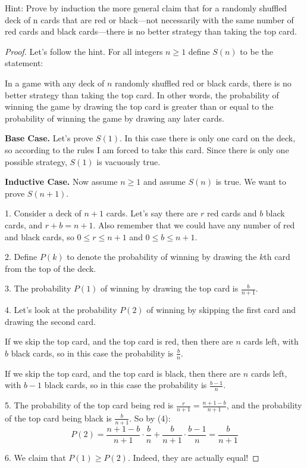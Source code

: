 \documentclass[14pt]{extarticle}
\begin{document}
Hint: Prove by induction the more general claim that for a randomly shuffled deck of n cards that are red or black—not necessarily with the same number of red cards and black cards—there is no better strategy
than taking the top card.
\begin{proof}
Let's follow the hint. For all integers $n \geq 1$ define $S(n)$ to be the statement:

In a game with any deck of $n$ randomly shuffled red or black cards, there is no better strategy than taking the top card. In other words, the probability of winning the game by drawing the top card is greater than or equal to the probability of winning the game by drawing any later cards.

{\bf Base Case.} Let's prove $S(1)$. In this case there is only one card on the deck, so according to the rules I am forced to take this card. Since there is only one possible strategy, $S(1)$ is vacuously true.

{\bf Inductive Case.} Now assume $n \geq 1$ and assume $S(n)$ is true. We want to prove $S(n+1)$. 

1. Consider a deck of $n+1$ cards. Let's say there are $r$ red cards and $b$ black cards, and $r + b = n+1$. Also remember that we could have any number of red and black cards, so $0 \leq r \leq n+1$ and $0 \leq b \leq n+1$.

2. Define $P(k)$ to denote the probability of winning by drawing the $k$th  card from the top of the deck.

3. The probability $P(1)$ of winning by drawing the top card is $\displaystyle \frac{b}{n+1}$.

4. Let's look at the probability $P(2)$ of winning by skipping the first card and drawing the second card.

If we skip the top card, and the top card is red, then there are $n$ cards left, with $b$ black cards, so in this case the probability is $\displaystyle \frac{b}{n}$.

If we skip the top card, and the top card is black, then there are $n$ cards left, with $b-1$ black cards, so in this case the probability is $\displaystyle \frac{b-1}{n}$.

5. The probability of the top card being red is $\displaystyle\frac{r}{n+1} = \frac{n+1-b}{n+1}$, and the probability of the top card being black is $\displaystyle\frac{b}{n+1}$. So by (4):
$$
P(2) = \frac{n+1-b}{n+1} \cdot \frac{b}{n} + \frac{b}{n+1}\cdot\frac{b-1}{n} = \frac{b}{n+1}
$$

6. We claim that $P(1) \geq P(2)$. Indeed, they are actually equal!


\end{proof}
\end{document}
